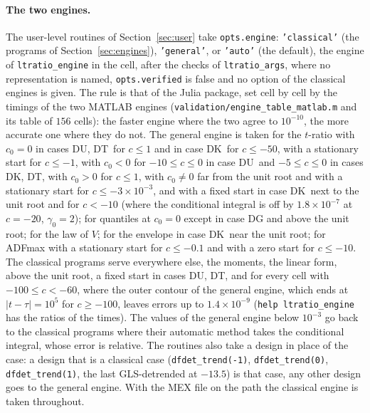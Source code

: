 \documentclass[11pt]{article}
\newcommand{\code}[1]{\texttt{#1}}
\newcommand{\Fk}{\textsf{DK}}
\newcommand{\Fu}{\textsf{DU}}
\newcommand{\Ft}{\textsf{DT}}
\begin{document}
\paragraph{The two engines.}  The user-level routines of Section~\ref{sec:user} take \code{opts.engine}: \code{'classical'} (the programs of Section~\ref{sec:engines}), \code{'general'}, or \code{'auto'} (the default), the engine of \code{ltratio\_engine} in the cell, after the checks of \code{ltratio\_args}, where no representation is named, \code{opts.verified} is false and no option of the classical engines is given.  The rule is that of the Julia package, set cell by cell by the timings of the two MATLAB engines (\code{validation/engine\_table\_matlab.m} and its table of $156$ cells): the faster engine where the two agree to $10^{-10}$, the more accurate one where they do not.  The general engine is taken for the $t$-ratio with $c_0=0$ in cases \Fu, \Ft\ for $c\le1$ and in case \Fk\ for $c\le-50$, with a stationary start for $c\le-1$, with $c_0<0$ for $-10\le c\le0$ in case \Fu\ and $-5\le c\le0$ in cases \Fk, \Ft, with $c_0>0$ for $c\le1$, with $c_0\ne0$ far from the unit root and with a stationary start for $c\le-3\times10^{-3}$, and with a fixed start in case \Fk\ next to the unit root and for $c<-10$ (where the conditional integral is off by $1.8\times10^{-7}$ at $c=-20$, $\gamma_0=2$); for quantiles at $c_0=0$ except in case \textsf{DG} and above the unit root; for the law of $V$; for the envelope in case \Fk\ near the unit root; for ADFmax with a stationary start for $c\le-0.1$ and with a zero start for $c\le-10$.  The classical programs serve everywhere else, the moments, the linear form, above the unit root, a fixed start in cases \Fu, \Ft, and for every cell with $-100\le c<-60$, where the outer contour of the general engine, which ends at $|t-\tau|=10^5$ for $c\ge-100$, leaves errors up to $1.4\times10^{-9}$ (\code{help ltratio\_engine} has the ratios of the times).  The values of the general engine below $10^{-3}$ go back to the classical programs where their automatic method takes the conditional integral, whose error is relative.  The routines also take a design in place of the case: a design that is a classical case (\code{dfdet\_trend(-1)}, \code{dfdet\_trend(0)}, \code{dfdet\_trend(1)}, the last GLS-detrended at $-13.5$) is that case, any other design goes to the general engine.  With the MEX file on the path the classical engine is taken throughout.
\end{document}
